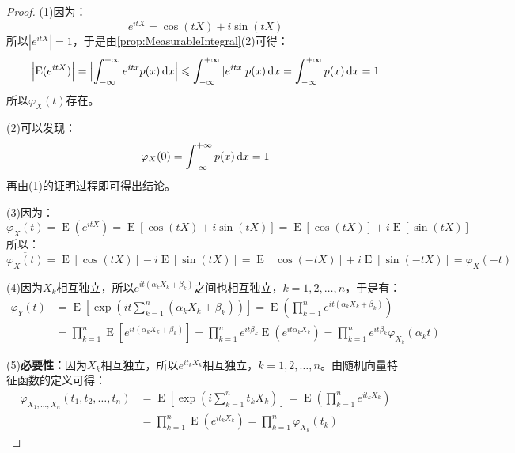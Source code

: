 \begin{proof}
	(1)因为：
	\begin{equation*}
		e^{itX}=\cos(tX)+i\sin(tX)
	\end{equation*}
	所以$|e^{itX}|=1$，于是由\cref{prop:MeasurableIntegral}(2)可得：
	\begin{equation*}
		\Bigl|\operatorname{E}(e^{itX})\Bigr|=\Bigl|\int_{-\infty}^{+\infty}e^{itx}p(x)\mathop{}\!\mathrm{d} x\Bigr|\leqslant\int_{-\infty}^{+\infty}|e^{itx}|p(x)\mathop{}\!\mathrm{d} x=\int_{-\infty}^{+\infty}p(x)\mathop{}\!\mathrm{d} x=1
	\end{equation*}
	所以$\varphi_X(t)$存在。\par
	(2)可以发现：
	\begin{equation*}
		\varphi_X(0)=\int_{-\infty}^{+\infty}p(x)\mathop{}\!\mathrm{d} x=1
	\end{equation*}
	再由(1)的证明过程即可得出结论。\par
	(3)因为：
	\begin{equation*}
		\varphi_X(t)=\operatorname{E}(e^{itX})=\operatorname{E}[\cos(tX)+i\sin(tX)]=\operatorname{E}[\cos(tX)]+i\operatorname{E}[\sin(tX)]
	\end{equation*}
	所以：
	\begin{equation*}
		\overline{\varphi_X(t)}=\operatorname{E}[\cos(tX)]-i\operatorname{E}[\sin(tX)]=\operatorname{E}[\cos(-tX)]+i\operatorname{E}[\sin(-tX)]=\varphi_X(-t)
	\end{equation*}\par
	(4)因为$X_k$相互独立，所以$e^{it(\alpha_kX_k+\beta_k)}$之间也相互独立，$k=1,2,\dots,n$，于是有：
	\begin{align*}
		\varphi_Y(t)
		&=\operatorname{E}\left[\exp\left(it\sum_{k=1}^{n}(\alpha_kX_k+\beta_k)\right)\right]
		=\operatorname{E}\left(\prod_{k=1}^ne^{it(\alpha_kX_k+\beta_k)}\right) \\
		&=\prod_{k=1}^n\operatorname{E}[e^{it(\alpha_kX_k+\beta_k)}]
		=\prod_{k=1}^ne^{it\beta_k}\operatorname{E}(e^{it\alpha_kX_k})
		=\prod_{k=1}^ne^{it\beta_k}\varphi_{X_k}(\alpha_kt)
	\end{align*}\par
	(5)\textbf{必要性：}因为$X_k$相互独立，所以$e^{it_kX_k}$相互独立，$k=1,2,\dots,n$。由随机向量特征函数的定义可得：
	\begin{align*}
		\varphi_{X_1,\dots,X_n}(t_1,t_2,\dots,t_n)
		&=\operatorname{E}\left[\exp\left(i\sum_{k=1}^{n}t_kX_k\right)\right]
		=\operatorname{E}\left(\prod_{k=1}^ne^{it_kX_k}\right) \\
		&=\prod_{k=1}^n\operatorname{E}(e^{it_kX_k})
		=\prod_{k=1}^n\varphi_{X_k}(t_k)

\end{align*}
\end{proof}

